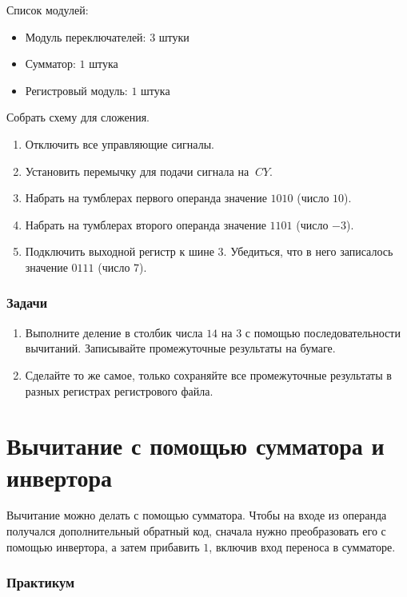 Список модулей:
\begin{itemize}
    \item Модуль переключателей: $3$ штуки
    \item Сумматор: $1$ штука
    \item Регистровый модуль: $1$ штука
\end{itemize}

Собрать схему для сложения.

\begin{enumerate}
    \item Отключить все управляющие сигналы.
    \item Установить перемычку для подачи сигнала на $~CY$.
    \item Набрать на тумблерах первого операнда значение $1010$ (число $10$).
    \item Набрать на тумблерах второго операнда значение $1101$ (число $-3$).
    \item Подключить выходной регистр к шине $3$. Убедиться, что в него записалось значение $0111$ (число $7$).
\end{enumerate}

\subsubsection{Задачи}
\begin{enumerate}
    \item Выполните деление в столбик числа $14$ на $3$ с помощью последовательности вычитаний.
          Записывайте промежуточные результаты на бумаге.
    \item Сделайте то же самое, только сохраняйте все промежуточные результаты в разных
          регистрах регистрового файла.
\end{enumerate}

\section{Вычитание с помощью сумматора и инвертора}

Вычитание можно делать с помощью сумматора. Чтобы на входе из операнда получался дополнительный
обратный код, сначала нужно преобразовать его с помощью инвертора, а затем прибавить $1$,
включив вход переноса в сумматоре.

\subsubsection{Практикум}


